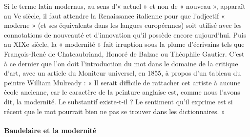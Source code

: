 Si le terme latin modernus, au sens d'« actuel » et non de « nouveau », apparaît au Ve siècle, il faut attendre la Renaissance italienne pour que l'adjectif « moderne » (et ses équivalents dans les langues européennes) soit utilisé avec les connotations de nouveauté et d'innovation qu'il possède encore aujourd'hui. Puis au XIXe siècle, la « modernité » fait irruption sous la plume d'écrivains tels que François-René de Chateaubriand, Honoré de Balzac ou Théophile Gautier.
C'est à ce dernier que l'on doit l'introduction du mot dans le domaine de la critique d'art, avec un article du Moniteur universel, en 1855, à propos d'un tableau du peintre William Mulready : « Il serait difficile de rattacher cet artiste à aucune école ancienne, car le caractère de la peinture anglaise est, comme nous l'avons dit, la modernité. Le substantif existe-t-il ?
Le sentiment qu'il exprime est si récent que le mot pourrait bien ne pas se trouver dans les dictionnaires. »

\paragraph{Baudelaire et la modernité}



